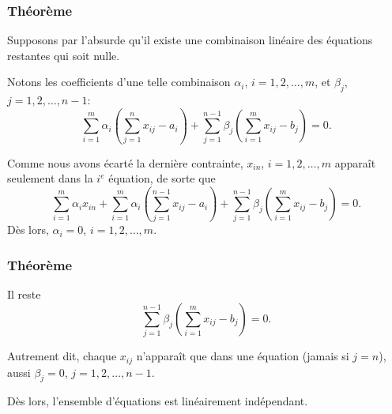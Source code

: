 \documentclass[usepdftitle=false, aspectratio=169]{beamer}
\begin{document}
\begin{frame}
\frametitle{Théorème}

Supposons par l'absurde qu'il existe une combinaison linéaire des équations restantes qui soit nulle.

Notons les coefficients d'une telle combinaison $\alpha_i$, $i = 1,2,\ldots,m$, et $\beta_j$, $j = 1,2,\ldots,n-1$:
\[
\sum_{i = 1}^m \alpha_i \left( \sum_{j = 1}^n x_{ij} - a_i \right) +
\sum_{j = 1}^{n-1} \beta_j \left( \sum_{i = 1}^m x_{ij} - b_j \right) = 0.
\]

\mbox{}

Comme nous avons écarté la dernière contrainte, $x_{in}$, $i = 1,2,\ldots,m$ apparaît seulement dans la $i^e$ équation, de sorte que
\[
\sum_{i = 1}^m \alpha_i x_{in} + \sum_{i = 1}^m \alpha_i \left( \sum_{j = 1}^{n-1} x_{ij} - a_i \right) +
\sum_{j = 1}^{n-1} \beta_j \left( \sum_{i = 1}^m x_{ij} - b_j \right) = 0.
\]
Dès lors, $\alpha_i = 0$, $i = 1, 2,\ldots,m$.

\end{frame}

\begin{frame}
\frametitle{Théorème}

Il reste
\[
\sum_{j = 1}^{n-1} \beta_j \left( \sum_{i = 1}^m x_{ij} - b_j \right) = 0.
\]

Autrement dit, chaque $x_{ij}$ n'apparaît que dans une équation (jamais si $j=n$), aussi $\beta_j = 0$, $j = 1,2,\ldots,n-1$.

\mbox{}

Dès lors, l'ensemble d'équations est linéairement indépendant.

\end{frame}
\end{document}
